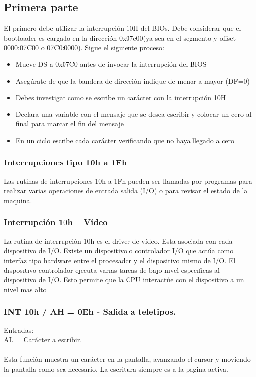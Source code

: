\documentclass[12pt]{article}
\begin{document}
\subsection{Primera parte}
El primero debe utilizar la interrupción 10H del BIOs. Debe considerar que el bootloader es cargado en la dirección 0x07c00(ya sea en el segmento y offset 0000:07C00 o 07C0:0000). Sigue el siguiente proceso:
\begin{itemize}
    \item Mueve DS a 0x07C0 antes de invocar la interrupción del BIOS \cite{BasicBootloader}
    \item Asegúrate de que la bandera de dirección indique de menor a mayor (DF=0) \cite{DF} \cite{cld} \cite{banderas}
    \item Debes investigar como se escribe un carácter con la interrupción 10H \cite{Int10h} \cite{list} \cite{HowtoHello}
    \item Declara una variable con el mensaje que se desea escribir y colocar un cero al final para marcar el fin del mensaje
    \item En un ciclo escribe cada carácter verificando que no haya llegado a cero
\end{itemize}
\subsubsection{Interrupciones tipo 10h a 1Fh} 
Las rutinas de interrupciones 10h a 1Fh pueden ser llamadas por programas para realizar varias operaciones de entrada salida (I/O) o para revisar el estado de la maquina. 
\subsubsection{Interrupción 10h -- Vídeo}
La rutina de interrupción 10h es el driver de vídeo. Esta asociada con cada dispositivo de I/O. Existe un dispositivo o controlador I/O que actúa como interfaz tipo hardware entre el procesador y el dispositivo mismo de I/O. El dispositivo controlador ejecuta varias tareas de bajo nivel especificas al dispositivo de I/O. Esto permite que la CPU interactúe con el dispositivo a un nivel mas alto \cite{Int10h}
\subsubsection{INT 10h / AH = 0Eh - Salida a teletipos.}
Entradas:\\
AL = Carácter a escribir.\\\\
Esta función muestra un carácter en la pantalla, avanzando el cursor y moviendo la pantalla como sea necesario. La escritura siempre es a la pagina activa. \cite{list}
\end{document}
